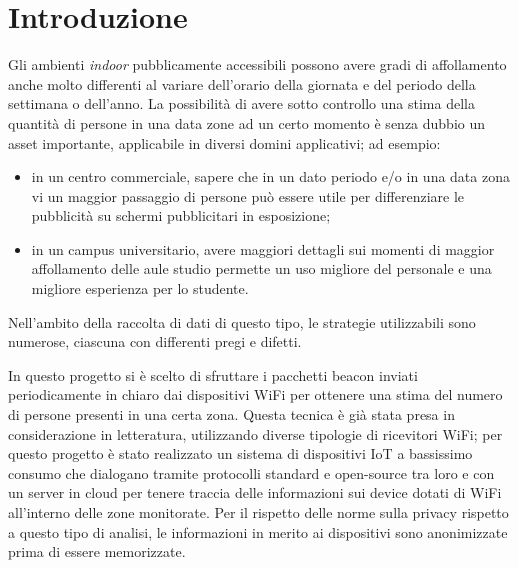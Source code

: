 \section{Introduzione}




Gli ambienti \textit{indoor} pubblicamente accessibili possono avere gradi di affollamento anche molto differenti al variare dell'orario della giornata e del periodo della settimana o dell'anno.
La possibilità di avere sotto controllo una stima della quantità di persone in una data zone ad un certo momento è senza dubbio un asset importante, applicabile in diversi domini applicativi;
ad esempio:

\begin{itemize}
  \item in un centro commerciale, sapere che in un dato periodo e/o in una data zona vi un maggior passaggio di persone può essere utile per differenziare le pubblicità su schermi pubblicitari in esposizione;
  \item in un campus universitario, avere maggiori dettagli sui momenti di maggior affollamento delle aule studio permette un uso migliore del personale e una migliore esperienza per lo studente.
\end{itemize}

Nell'ambito della raccolta di dati di questo tipo, le strategie utilizzabili sono numerose, ciascuna con differenti pregi e difetti.

In questo progetto si è scelto di sfruttare i pacchetti beacon inviati periodicamente in chiaro dai dispositivi WiFi per ottenere una stima del numero di persone presenti in una certa zona.
Questa tecnica è già stata presa in considerazione in letteratura, utilizzando diverse tipologie di ricevitori WiFi;
per questo progetto è stato realizzato un sistema di dispositivi IoT a bassissimo consumo che dialogano tramite protocolli standard e open-source tra loro e con un server in cloud per tenere traccia delle informazioni sui device dotati di WiFi all'interno delle zone monitorate.
Per il rispetto delle norme sulla privacy rispetto a questo tipo di analisi, le informazioni in merito ai dispositivi sono anonimizzate prima di essere memorizzate.
